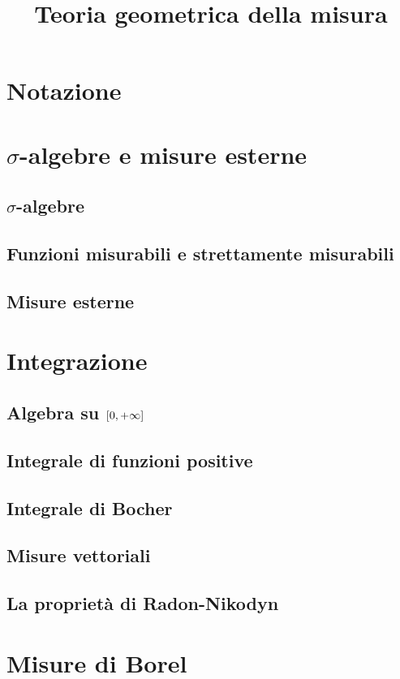 \documentclass[a4paper, 11pt]{book}
\title{Teoria geometrica della misura}
\author{}
\date{}
\begin{document}
\maketitle
\frontmatter
\tableofcontents
\chapter{Notazione}

\mainmatter
\chapter{$\sigma$-algebre e misure esterne}
\section{$\sigma$-algebre}
\section{Funzioni misurabili e strettamente misurabili}
\section{Misure esterne}

\chapter{Integrazione}
\section{Algebra su $\left[{0},{+\infty}\right]$}
\section{Integrale di funzioni positive}
\section{Integrale di Bocher}
\section{Misure vettoriali}
\section{La proprietà di Radon-Nikodyn}

\chapter{Misure di Borel}
\end{document}

